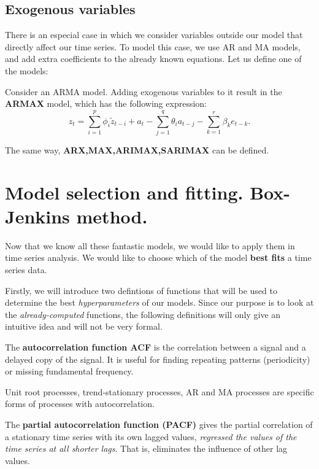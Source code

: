\subsection{Exogenous variables}

There is an especial case in which we consider variables outside our model that directly affect our time series. To model this case, we use AR and MA models, and add extra coefficients to the already known equations. Let us define one of the models:

\begin{ndef}
  Consider an ARMA model. Adding exogenous variables to it result in the \textbf{ARMAX} model, which has the following expression:
  \[
    z_{t} = \sum_{i = 1}^{p}\phi_{i} \tilde z_{t-i} + a_{t} - \sum_{j = 1}^{q} \theta_{i}a_{t-j} - \sum_{k=1}^{r} \beta_{k} e_{t-k}.
  \]
\end{ndef}

The same way, \textbf{ARX,MAX,ARIMAX,SARIMAX} can be defined.


\section{Model selection and fitting. Box-Jenkins method.}

Now that we know all these fantastic models, we would like to apply them in time series analysis. We would like to choose which of the model \textbf{best fits} a time series data.

Firstly, we will introduce two defintions of functions that will be used to determine the best \emph{hyperparameters} of our models. Since our purpose is to look at the \emph{already-computed} functions, the following definitions will only give an intuitive idea and will not be very formal.

\begin{ndef}
The \textbf{autocorrelation function ACF} is the correlation between a signal and a delayed copy of the signal. It is useful for finding repeating patterns (periodicity) or missing fundamental frequency.
\end{ndef}

\begin{note}
Unit root processes, trend-stationary processes, AR and MA processes are specific forms of processes with autocorrelation.
\end{note}

\begin{ndef}
The \textbf{partial autocorrelation function (PACF)} gives the partial correlation of a stationary time series with its own lagged values, \emph{regressed the values of the time series at all shorter lags}. That is, eliminates the influence of other lag values.
\end{ndef}


